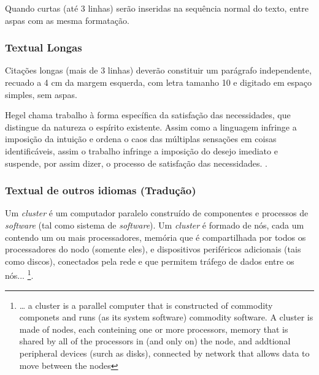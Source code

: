 Quando curtas (até 3 linhas) serão inseridas na sequência normal do texto, entre aspas com as mesma formatação.

\subsubsection{\esp Textual Longas}

Citações longas (mais de 3 linhas) deverão constituir um parágrafo independente, recuado a 4 cm da margem esquerda, 
com letra tamanho 10 e digitado em espaço simples, sem aspas.
\begin{citacaodireta}
Hegel chama trabalho à forma específica da satisfação das necessidades, que
distingue da natureza o espírito existente. Assim como a linguagem infringe
a imposição da intuição e ordena o caos das múltiplas sensações em coisas
identificáveis, assim o trabalho infringe a imposição do \hspace{0.1cm}desejo \hspace{0.1cm}imediato \hspace{0.1cm}e
suspende, por assim dizer, o processo de satisfação das necessidades.
\cite[25]{habermas}.
\end{citacaodireta}



\subsubsection{\esp Textual de outros idiomas (Tradução)}

\begin{citacaodireta} 
Um \textit{cluster} é um computador paralelo construído de componentes e processos de \textit{software} (tal como sistema de \textit{software}). 
Um \textit{cluster} é formado de nós, cada um contendo um ou mais processadores, memória que é compartilhada por todos os processadores do nodo 
(somente eles), e dispositivos periféricos adicionais (tais como discos), conectados pela rede e que permitem tráfego de dados entre os nós...
\cite[p. 10, tradução nossa]{groupp}\footnote {  … a cluster is a parallel computer that is constructed of commodity  componets and runs 
(as its system software) commodity software. A cluster is made of nodes, each conteining one or more processors, memory that is  shared 
by all of the processors in (and only on) the node, and addtional peripheral devices (surch as disks),
 connected by network that allows data to move between the nodes}.
\end{citacaodireta}
 
